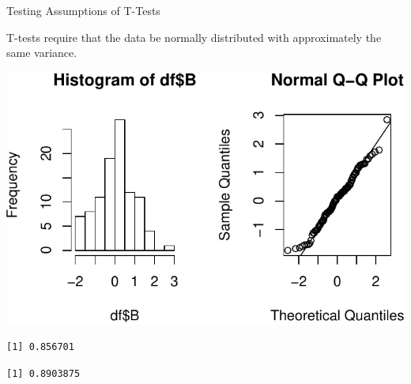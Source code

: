 \begin{frame}[fragile]{Testing Assumptions of T-Tests}

T-tests require that the data be normally distributed with approximately
the same variance.

\begin{Shaded}
\begin{Highlighting}[]
\NormalTok{(} \NormalTok{(}\NormalTok{,}\NormalTok{))}
\OperatorTok{$}
\OperatorTok{$}
\NormalTok{(}\NormalTok{, }\NormalTok{)}
\end{Highlighting}
\end{Shaded}

\includegraphics{04_BasicAnalyses_files/figure-beamer/unnamed-chunk-5-1.pdf}

\begin{Shaded}
\begin{Highlighting}[]
\OperatorTok{$}
\end{Highlighting}
\end{Shaded}

\begin{verbatim}
[1] 0.856701
\end{verbatim}

\begin{Shaded}
\begin{Highlighting}[]
\OperatorTok{$}
\end{Highlighting}
\end{Shaded}

\begin{verbatim}
[1] 0.8903875
\end{verbatim}

\end{frame}

